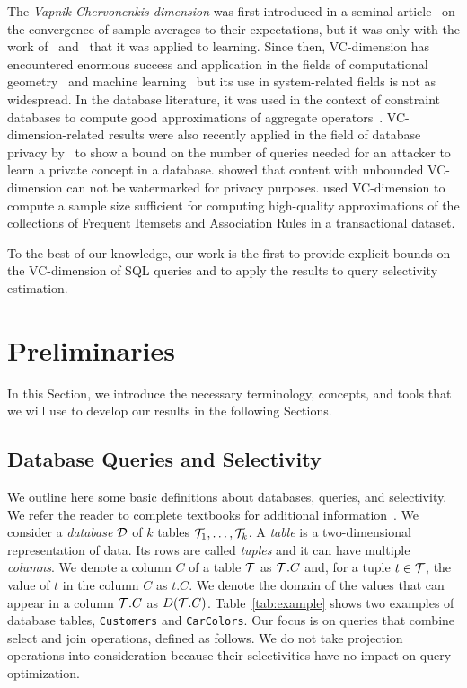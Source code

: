 The {\em Vapnik-Chervonenkis dimension} was first introduced in a seminal
article~\citep{VapnikC71} on the convergence of sample averages to their
expectations, but it was only with the work of~\citet{HausslerW86}
and~\citet{BlumerEHW89} that it was applied to learning. Since then,
VC-dimension has encountered enormous success and application in the fields of
computational geometry~\citep{Chazelle00,Matousek02} and machine
learning~\citep{AnthonyB99,MohriRT12} but
its use in system-related fields is not as widespread. In the database
literature, it was used in the context of constraint databases to compute good
approximations of aggregate operators~\citep{BenediktL02}. VC-dimension-related
results were also recently applied in the field of database privacy
by~\citet{BlumLR08} to show a bound on the number of queries needed
for an attacker to learn a private concept in a database. \citet{Gross11} showed
that content with unbounded VC-dimension can not be watermarked for privacy
purposes. \citet{RiondatoU12} used VC-dimension to compute a sample size
sufficient for computing high-quality approximations of the collections of
Frequent Itemsets and Association Rules in a transactional dataset.

To the best of our knowledge, our work is the first to provide explicit bounds
on the VC-dimension of SQL queries and to apply the results to query selectivity
estimation.

\section{Preliminaries}\label{sec:vcfreqprelim}
In this Section, we introduce the necessary terminology, concepts, and tools
that we will use to develop our results in the following Sections.

\subsection{Database Queries and Selectivity}
We outline here some basic definitions about databases, queries, and
selectivity. We refer the reader to complete textbooks for additional
information~\citep{GarciaMolinaUW02}.
We consider a \emph{database} ${\cal D}$ of $k$ tables ${\cal T}_1,\dotsc,{\cal T}_k$. 
A \emph{table} is a two-dimensional representation of data. Its rows are called
\emph{tuples} and it can have multiple \emph{columns}.  We denote a
column $C$ of a table ${\cal T}$ as ${\cal T}.C$ and, for a tuple $t\in{\cal T}$, the value
of $t$ in the column $C$ as $t.C$. We denote the domain of the values that can
appear in a column ${\cal T}.C$ as $D({\cal T}.C)$. Table~\ref{tab:example} shows two
examples of database tables, \texttt{Customers} and \texttt{CarColors}. Our
focus is on queries that combine select and join operations, defined as follows.
We do not take projection operations into consideration because their
selectivities have no impact on query optimization.

